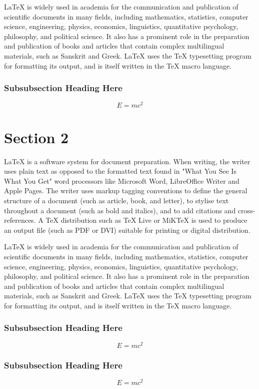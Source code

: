 \documentclass[journal]{Imperial_lab_report}
\begin{document}
LaTeX is widely used in academia for the communication and publication of scientific documents in many fields, including mathematics, statistics, computer science, engineering, physics, economics, linguistics, quantitative psychology, philosophy, and political science. It also has a prominent role in the preparation and publication of books and articles that contain complex multilingual materials, such as Sanskrit and Greek. LaTeX uses the TeX typesetting program for formatting its output, and is itself written in the TeX macro language.
\subsubsection{Subsubsection Heading Here}
$$ E = mc^2$$

\section{Section 2}
LaTeX is a software system for document preparation. When writing, the writer uses plain text as opposed to the formatted text found in "What You See Is What You Get" word processors like Microsoft Word, LibreOffice Writer and Apple Pages. The writer uses markup tagging conventions to define the general structure of a document (such as article, book, and letter), to stylise text throughout a document (such as bold and italics), and to add citations and cross-references. A TeX distribution such as TeX Live or MiKTeX is used to produce an output file (such as PDF or DVI) suitable for printing or digital distribution.

LaTeX is widely used in academia for the communication and publication of scientific documents in many fields, including mathematics, statistics, computer science, engineering, physics, economics, linguistics, quantitative psychology, philosophy, and political science. It also has a prominent role in the preparation and publication of books and articles that contain complex multilingual materials, such as Sanskrit and Greek. LaTeX uses the TeX typesetting program for formatting its output, and is itself written in the TeX macro language.

\subsubsection{Subsubsection Heading Here}
$$ E = mc^2$$
\subsubsection{Subsubsection Heading Here}
$$ E = mc^2$$
\end{document}
